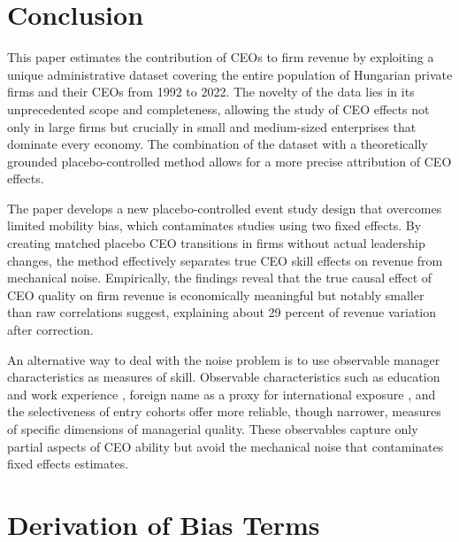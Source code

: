 \documentclass[11pt,a4paper]{article}
\begin{document}
\section{Conclusion}

This paper estimates the contribution of CEOs to firm revenue by exploiting a unique administrative dataset covering the entire population of Hungarian private firms and their CEOs from 1992 to 2022. The novelty of the data lies in its unprecedented scope and completeness, allowing the study of CEO effects not only in large firms but crucially in small and medium-sized enterprises that dominate every economy. The combination of the dataset with a theoretically grounded placebo-controlled method allows for a more precise attribution of CEO effects. 

The paper develops a new placebo-controlled event study design that overcomes limited mobility bias, which contaminates studies using two fixed effects.  By creating matched placebo CEO transitions in firms without actual leadership changes, the method effectively separates true CEO skill effects on revenue from mechanical noise. Empirically, the findings reveal that the true causal effect of CEO quality on firm revenue is economically meaningful but notably smaller than raw correlations suggest, explaining about 29 percent of revenue variation after correction. 

An alternative way to deal with the noise problem is to use observable manager characteristics as measures of skill. Observable characteristics such as education and work experience \citep{DePirro2025}, foreign name as a proxy for international exposure \citep{Koren2023expat}, and the selectiveness of entry cohorts \citep{koren2024managers} offer more reliable, though narrower, measures of specific dimensions of managerial quality. These observables capture only partial aspects of CEO ability but avoid the mechanical noise that contaminates fixed effects estimates.

\clearpage



\clearpage
\appendix
\renewcommand{\thefigure}{A\arabic{figure}}
\renewcommand{\thetable}{A\arabic{table}}
\setcounter{figure}{0}
\setcounter{table}{0}

\section{Derivation of Bias Terms}
\end{document}
